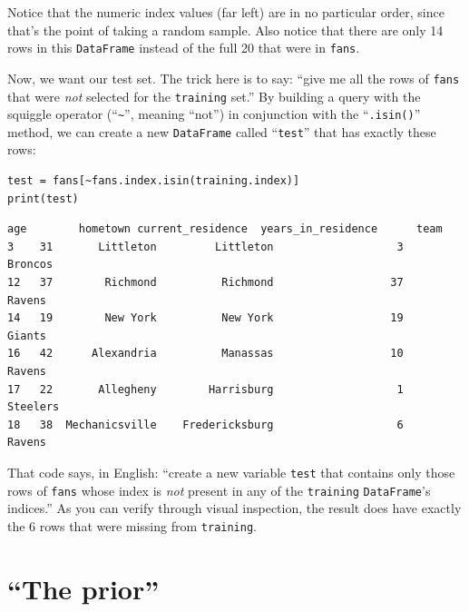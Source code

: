 Notice that the numeric index values (far left) are in no particular order,
since that's the point of taking a random sample. Also notice that there are
only 14 rows in this \texttt{DataFrame} instead of the full 20 that were in
\texttt{fans}.


Now, we want our test set. The trick here is to say: ``give me all the rows of
\texttt{fans} that were \textit{not} selected for the \texttt{training} set.''
By building a query with the squiggle operator (``\texttt{\textasciitilde}'',
meaning ``not'') in conjunction with the ``\texttt{.isin()}'' method, we can
create a new \texttt{DataFrame} called ``\texttt{test}'' that has exactly these
rows:

\begin{Verbatim}[fontsize=\footnotesize,samepage=true,frame=single,framesep=3mm]
test = fans[~fans.index.isin(training.index)]
print(test)
\end{Verbatim}
\vspace{-.2in}

\begin{Verbatim}[fontsize=\CBCodeSmall,samepage=true,frame=leftline,framesep=5mm,framerule=1mm]
    age        hometown current_residence  years_in_residence      team
3    31       Littleton         Littleton                   3   Broncos
12   37        Richmond          Richmond                  37    Ravens
14   19        New York          New York                  19    Giants
16   42      Alexandria          Manassas                  10    Ravens
17   22       Allegheny        Harrisburg                   1  Steelers
18   38  Mechanicsville    Fredericksburg                   6    Ravens
\end{Verbatim}

That code says, in English: ``create a new variable \texttt{test} that contains
only those rows of \texttt{fans} whose index is \textit{not} present in any of
the \texttt{training} \texttt{DataFrame}'s indices.'' As you can verify through
visual inspection, the result does have exactly the 6 rows that were missing
from \texttt{training}.

\section{``The prior''}

